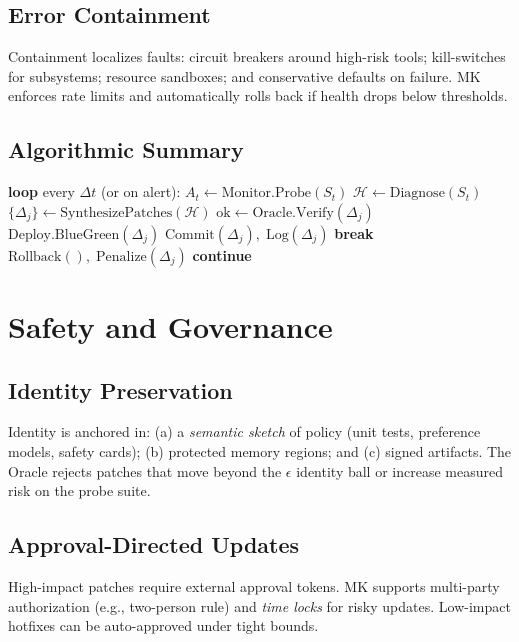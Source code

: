 \documentclass[12pt]{article}
\begin{document}
\subsection{Error Containment}
Containment localizes faults: circuit breakers around high-risk tools; kill-switches for subsystems; resource sandboxes; and conservative defaults on failure. MK enforces rate limits and automatically rolls back if health drops below thresholds.

\subsection{Algorithmic Summary}
\begin{algorithm}[H]
\caption{Self-Maintenance Cycle (SMC)}
\begin{algorithmic}[1]
\State \textbf{loop} every $\Delta t$ (or on alert):
\State \quad $A_t \gets \text{Monitor.Probe}(S_t)$
    \State $\mathcal{H} \gets \text{Diagnose}(S_t)$ 
    \State $\{\Delta_j\} \gets \text{SynthesizePatches}(\mathcal{H})$
        \State $\text{ok} \gets \text{Oracle.Verify}(\Delta_j)$ 
            \State $\text{Deploy.BlueGreen}(\Delta_j)$
                \State $\text{Commit}(\Delta_j), \; \text{Log}(\Delta_j)$
                \State \textbf{break}
            \Else
                \State $\text{Rollback}(), \; \text{Penalize}(\Delta_j)$
            \EndIf
        \EndIf
    \EndFor
\Else
    \State \textbf{continue}
\EndIf
\end{algorithmic}
\end{algorithm}

\section{Safety and Governance}
\subsection{Identity Preservation}
Identity is anchored in: (a) a \emph{semantic sketch} of policy (unit tests, preference models, safety cards); (b) protected memory regions; and (c) signed artifacts. The Oracle rejects patches that move beyond the $\epsilon$ identity ball or increase measured risk on the probe suite.

\subsection{Approval-Directed Updates}
High-impact patches require external approval tokens. MK supports multi-party authorization (e.g., two-person rule) and \emph{time locks} for risky updates. Low-impact hotfixes can be auto-approved under tight bounds.
\end{document}
